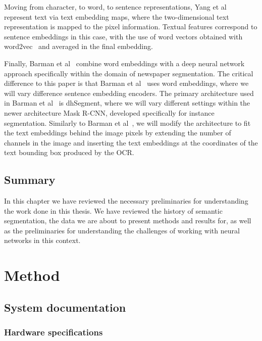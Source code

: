 \documentclass[oneside, english, bibtex]{kththesis}
\begin{document}
Moving from character, to word, to sentence representations, Yang et al~\cite{DBLP:journals/corr/YangYAKKG17} represent text via text embedding maps, where the two-dimensional text representation is mapped to the pixel information. Textual features correspond to sentence embeddings in this case, with the use of word vectors obtained with word2vec~\cite{mikolov2013} and averaged in the final embedding.

Finally, Barman et al~\cite{jdmdh:7097} combine word embeddings with a deep neural network approach specifically within the domain of newspaper segmentation. The critical difference to this paper is that Barman et al~\cite{jdmdh:7097} uses word embeddings, where we will vary difference sentence embedding encoders. The primary architecture used in Barman et al~\cite{jdmdh:7097} is dhSegment, where we will vary different settings within the newer architecture Mask R-CNN, developed specifically for instance segmentation. Similarly to Barman et al~\cite{jdmdh:7097}, we will modify the architecture to fit the text embeddings behind the image pixels by extending the number of channels in the image and inserting the text embeddings at the coordinates of the text bounding box produced by the OCR.

\section{Summary}

In this chapter we have reviewed the necessary preliminaries for understanding the work done in this thesis. We have reviewed the history of semantic segmentation, the data we are about to present methods and results for, as well as the preliminaries for understanding the challenges of working with neural networks in this context.

\clearpage


\chapter{Method}
\label{ch:method}

\section{System documentation}
\label{sec:sysdoc}

\subsection{Hardware specifications}
\end{document}
